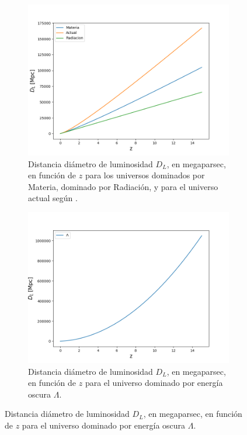 \documentclass[twoside]{article}
\begin{document}
					\begin{figure}[H]
						\centering
						\begin{subfigure}{.5\textwidth}
							\centering
							\includegraphics[scale=0.38]{DistanDiamLumino.png}
							\caption{Distancia diámetro de luminosidad $D_L$, en megaparsec, en función de $z$ para los universos dominados por Materia, dominado por Radiación, y para el universo actual según \cite{Plank}.}
							\label{Img:DisLum-All}
						\end{subfigure}%
						\begin{subfigure}{.5\textwidth}
							\centering
							\includegraphics[scale=0.38]{DistanDiamLumino(EnrgOsc).png}
							\caption{Distancia diámetro de luminosidad $D_L$, en megaparsec, en función de $z$ para el universo dominado por energía oscura $\Lambda$.}

\end{subfigure}
\end{figure}
\end{document}
